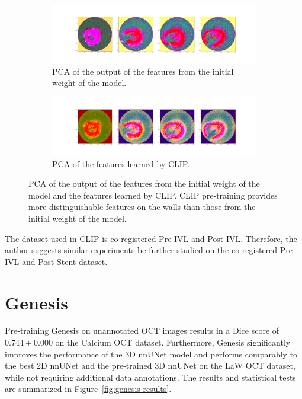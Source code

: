 \documentclass[a4paper,11pt,oneside]{report}
\begin{document}
\begin{figure}[h]
    \centering
    \begin{subfigure}[t]{0.5\textwidth}
        \centering
        \includegraphics[width=\linewidth]{figures/discussion_default_feature_map_batch0_feature1.png}
        \caption{PCA of the output of the features from the initial weight of the model.}
        \label{fig:pca-initial}
    \end{subfigure}%
    \begin{subfigure}[t]{0.5\textwidth}
        \centering
        \includegraphics[width=\linewidth]{figures/discussion_clip_feature_map_batch0_feature1.png}
        \caption{PCA of the features learned by CLIP.}
        \label{fig:pca-clip}
        
    \end{subfigure}
    \caption{PCA of the output of the features from the initial weight of the model and the features learned by CLIP. CLIP pre-training provides more distinguishable features on the walls than those from the initial weight of the model. 
    }
\end{figure}

The dataset used in CLIP is co-registered Pre-IVL and Post-IVL. Therefore, the author suggests similar experiments be further studied on the co-registered Pre-IVL and Post-Stent dataset.

\section{Genesis}
Pre-training Genesis on unannotated OCT images results in a Dice score of $0.744\pm0.000$ on the Calcium OCT dataset. Furthermore, Genesis significantly improves the performance of the 3D nnUNet model and performs comparably to the best 2D nnUNet and the pre-trained 3D nnUNet on the LaW OCT dataset, while not requiring additional data annotations. The results and statistical tests are summarized in Figure~\ref{fig:genesis-results}.
\end{document}

